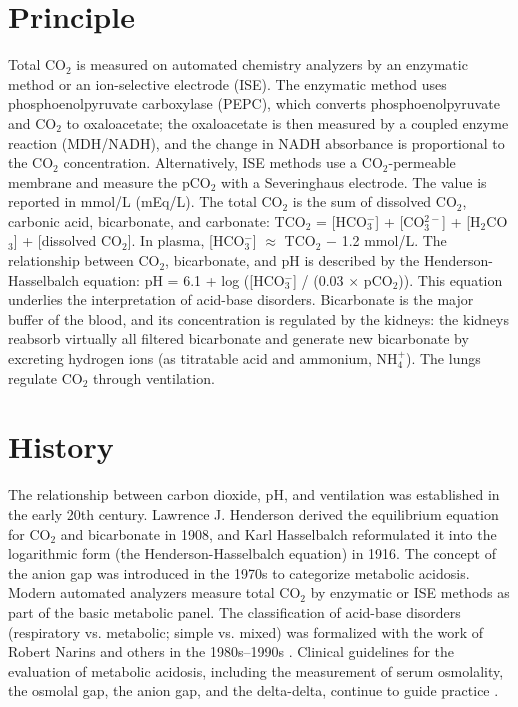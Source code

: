 \section*{Principle}
Total CO$_2$ is measured on automated chemistry analyzers by an enzymatic method or an ion-selective electrode (ISE). The enzymatic method uses phosphoenolpyruvate carboxylase (PEPC), which converts phosphoenolpyruvate and CO$_2$ to oxaloacetate; the oxaloacetate is then measured by a coupled enzyme reaction (MDH/NADH), and the change in NADH absorbance is proportional to the CO$_2$ concentration. Alternatively, ISE methods use a CO$_2$-permeable membrane and measure the pCO$_2$ with a Severinghaus electrode. The value is reported in mmol/L (mEq/L). The total CO$_2$ is the sum of dissolved CO$_2$, carbonic acid, bicarbonate, and carbonate: TCO$_2$ = [HCO$_3^-$] + [CO$_3^{2-}$] + [H$_2$CO$_3$] + [dissolved CO$_2$]. In plasma, [HCO$_3^-$] $\approx$ TCO$_2$ $-$ 1.2 mmol/L. The relationship between CO$_2$, bicarbonate, and pH is described by the Henderson-Hasselbalch equation: pH = 6.1 + log ([HCO$_3^-$] / (0.03 $\times$ pCO$_2$)). This equation underlies the interpretation of acid-base disorders. Bicarbonate is the major buffer of the blood, and its concentration is regulated by the kidneys: the kidneys reabsorb virtually all filtered bicarbonate and generate new bicarbonate by excreting hydrogen ions (as titratable acid and ammonium, NH$_4^+$). The lungs regulate CO$_2$ through ventilation.

\section*{History}
The relationship between carbon dioxide, pH, and ventilation was established in the early 20th century. Lawrence J. Henderson derived the equilibrium equation for CO$_2$ and bicarbonate in 1908, and Karl Hasselbalch reformulated it into the logarithmic form (the Henderson-Hasselbalch equation) in 1916. The concept of the anion gap was introduced in the 1970s to categorize metabolic acidosis. Modern automated analyzers measure total CO$_2$ by enzymatic or ISE methods as part of the basic metabolic panel. The classification of acid-base disorders (respiratory vs. metabolic; simple vs. mixed) was formalized with the work of Robert Narins and others in the 1980s--1990s \cite{seifter2014integration}. Clinical guidelines for the evaluation of metabolic acidosis, including the measurement of serum osmolality, the osmolal gap, the anion gap, and the delta-delta, continue to guide practice \cite{kraut2007serum}.

